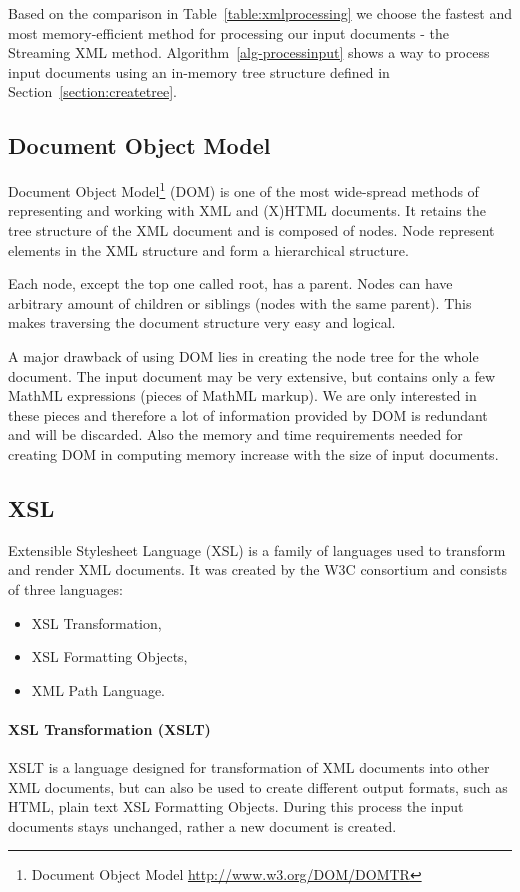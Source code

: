 \documentclass[11pt,oneside,final]{fithesis2}
\begin{document}
Based on the comparison in Table~\ref{table:xmlprocessing} we choose the fastest and most memory-efficient method for processing our input documents - the Streaming XML method. Algorithm~\ref{alg-processinput} shows a way to process input documents using an in-memory tree structure defined in Section~\ref{section:createtree}.

\iffalse
\subsection{Document Object Model}
Document Object Model\footnote{Document Object Model \url{http://www.w3.org/DOM/DOMTR}} (DOM) is one of the most wide-spread methods of representing and working with XML and (X)HTML documents. It retains the tree structure of the XML document and is composed of nodes. Node represent elements in the XML structure and form a hierarchical structure. 

Each node, except the top one called root, has a parent. Nodes can have arbitrary amount of children or siblings (nodes with the same parent). This makes traversing the document structure very easy and logical. 

A major drawback of using DOM lies in creating the node tree for the whole document. The input document may be very extensive, but contains only a few MathML expressions (pieces of MathML markup). We are only interested in these pieces and therefore a lot of information provided by DOM is redundant and will be discarded. Also the memory and time requirements needed for creating DOM in computing memory increase with the size of input documents.

\subsection{XSL}
\label{section:xsl}
Extensible Stylesheet Language (XSL) is a family of languages used to transform and render XML documents. It was created by the W3C consortium and consists of three languages:
\begin{itemize}
\item XSL Transformation,
\item XSL Formatting Objects,
\item XML Path Language.
\end{itemize}

\paragraph*{XSL Transformation (XSLT)} 
XSLT is a language designed for transformation of XML documents into other XML documents, but can also be used to create different output formats, such as HTML, plain text XSL Formatting Objects. During this process the input documents stays unchanged, rather a new document is created. 
\end{document}
